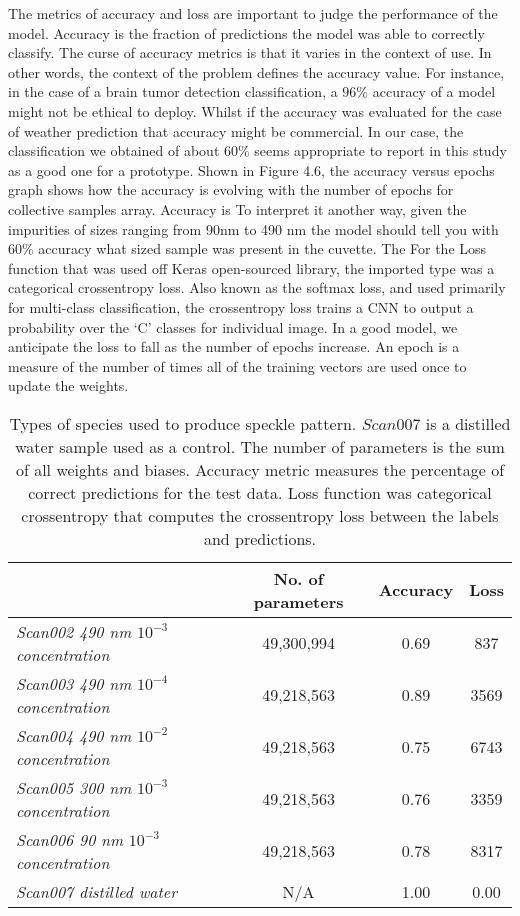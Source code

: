 The metrics of accuracy and loss are important to judge the performance of the model. Accuracy is the fraction of predictions the model was able to correctly classify. The curse of accuracy metrics is that it varies in the context of use. In other words, the context of the problem defines the accuracy value. For instance, in the case of a brain tumor detection classification, a $96\%$ accuracy of a model might not be ethical to deploy. Whilst if the accuracy was evaluated for the case of weather prediction that accuracy might be commercial. In our case, the classification we obtained of about $60\%$ seems appropriate to report in this study as a good one for a prototype. Shown in Figure 4.6, the accuracy versus epochs graph shows how the accuracy is evolving with the number of epochs for collective samples array. Accuracy is  To interpret it another way, given the impurities of sizes ranging from 90nm to 490 nm the model should tell you with 60\% accuracy what sized sample was present in the cuvette. The  For the Loss function that was used off Keras open-sourced library, the imported type was a categorical crossentropy loss. Also known as the softmax loss, and used primarily for multi-class classification, the crossentropy loss trains a CNN to output a probability over the `C' classes for individual image. In a good model, we anticipate the loss to fall as the number of epochs increase. An epoch is a measure of the number of times all of the training vectors are used once to update the weights. \\


\begin{table}
\begin{center}
\begin{tabular}{|l|c|c|c|}
\hline
{\sc \textbf{SAMPLES}  &  {\sc \textbf{No. of parameters}}  & {\sc \textbf{Accuracy}}  & {\sc \textbf{Loss}} \\
\hline
{\it Scan002 490 nm $ 10^{-3}$ concentration} & 49,300,994 & 0.69 & 837 \\
\hline
{\it Scan003 490 nm $ 10^{-4}$ concentration} & 49,218,563 & 0.89 & 3569 \\
\hline
{\it Scan004 490 nm $ 10^{-2}$ concentration} & 49,218,563 & 0.75 & 6743 \\
\hline
{\it Scan005 300 nm $ 10^{-3}$ concentration} & 49,218,563 & 0.76 & 3359 \\
\hline
{\it Scan006 90 nm $ 10^{-3}$ concentration}& 49,218,563 & 0.78 & 8317 \\
\hline
{\it Scan007 distilled water} & N/A & 1.00 & 0.00 \\
\hline

\end{tabular}
\end{center}
\caption[Samples and performance metrics]{Types of species used to produce speckle pattern. $Scan007$ is a distilled water sample used as a control. The number of parameters is the sum of all weights and biases. Accuracy metric measures the percentage of correct predictions for the test data. Loss function was categorical crossentropy that computes the crossentropy loss between the labels and predictions.}

\label{table_genomes}
\end{table}


